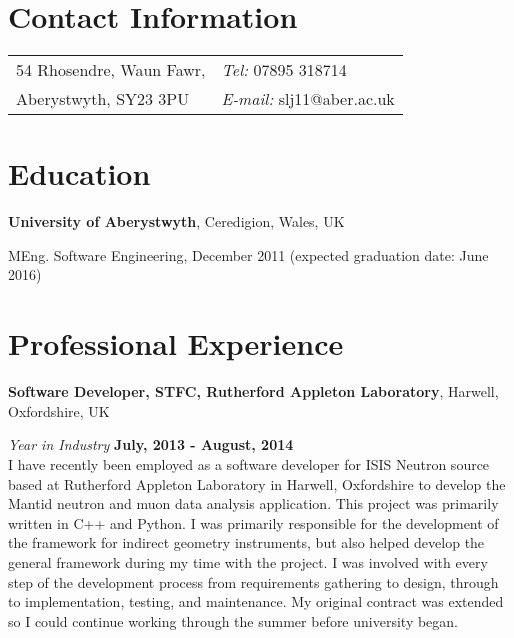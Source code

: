 \documentclass[margin,line]{res}
\newenvironment{list1}{
  \begin{list}{\ding{113}}{%
      \setlength{\itemsep}{0in}
      \setlength{\parsep}{0in} \setlength{\parskip}{0in}
      \setlength{\topsep}{0in} \setlength{\partopsep}{0in} 
      \setlength{\leftmargin}{0.17in}}}{\end{list}}
\begin{document}

\begin{resume}
\section{\sc Contact Information}
\vspace{.05in}
\begin{tabular}{@{}p{2in}p{4in}}
54 Rhosendre, Waun Fawr,             & {\it Tel:}  07895 318714 \\                  
Aberystwyth, SY23 3PU & {\it E-mail:}  slj11@aber.ac.uk\\       
\end{tabular}

\section{\sc Education}
{\bf University of Aberystwyth}, Ceredigion, Wales, UK\\
\vspace*{-.1in}
\begin{list1}
\item[] MEng. Software Engineering, December 2011 (expected
  graduation date: June 2016) \\
\end{list1}

\section{\sc Professional Experience}
{\bf Software Developer, STFC, Rutherford Appleton Laboratory}, Harwell, Oxfordshire, UK

\vspace{-.3cm}
{\em Year in Industry} \hfill {\bf July, 2013 - August, 2014}\\
I have recently been employed as a software developer for ISIS Neutron source based at Rutherford Appleton Laboratory in Harwell, Oxfordshire to develop the Mantid neutron and muon data analysis application. This project was primarily written in C++ and Python. I was primarily responsible for the development of the framework for indirect geometry instruments, but also helped develop the general framework during my time with the project. I was involved with every step of the development process from requirements gathering to design, through to implementation, testing, and maintenance. My original contract was extended so I could continue working through the summer before university began.


\end{resume}
\end{document}
